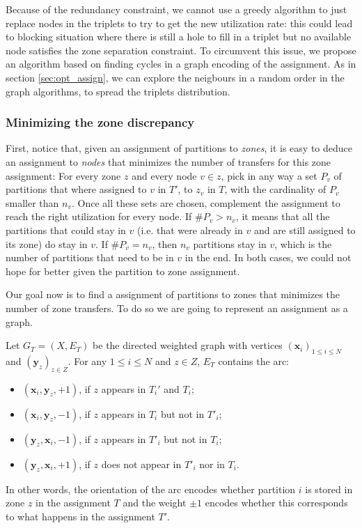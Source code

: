 \documentclass[]{article}
\begin{document}
Because of the redundancy constraint, we cannot use a greedy algorithm to just replace nodes in the triplets to try to get the new utilization rate: this could lead to blocking situation where there is still a hole to fill in a triplet but no available node satisfies the zone separation constraint. To circumvent this issue, we propose an algorithm based on finding cycles in a graph encoding of the assignment. As in section \ref{sec:opt_assign}, we can explore the neigbours in a random order in the graph algorithms, to spread the triplets distribution.


\subsubsection{Minimizing the zone discrepancy}


First, notice that, given an assignment of partitions to \emph{zones}, it is easy to deduce an assignment to \emph{nodes} that minimizes the number of transfers for this zone assignment: For every zone $z$ and every node $v\in z$, pick in any way a set $P_v$ of partitions that where assigned to $v$ in $T'$, to $z_v$ in $T$, with the cardinality of $P_v$ smaller than $n_v$. Once all these sets are chosen, complement the assignment to reach the right utilization for every node. If $\#P_v > n_v$, it means that all the partitions that could stay in $v$ (i.e. that were already in $v$ and are still assigned to its zone) do stay in $v$. If $\#P_v = n_v$, then $n_v$ partitions stay in $v$, which is the number of partitions that need to be in $v$ in the end. In both cases, we could not hope for better given the partition to zone assignment.

Our goal now is to find a assignment of partitions to zones that minimizes the number of zone transfers. To do so we are going to represent an assignment as a graph.

Let $G_T=(X,E_T)$ be the directed weighted graph with vertices $(\mathbf{x}_i)_{1\le i\le N}$ and $(\mathbf{y}_z)_{z\in Z}$. For any $1\le i\le N$ and $z\in Z$, $E_T$ contains  the arc:
\begin{itemize}
	\item $(\mathbf{x}_i, \mathbf{y}_z, +1)$, if $z$ appears in $T_i'$ and $T_i$;
	\item $(\mathbf{x}_i, \mathbf{y}_z, -1)$, if $z$ appears in $T_i$ but not in $T'_i$;
	\item $(\mathbf{y}_z, \mathbf{x}_i, -1)$, if $z$ appears in $T'_i$ but not in $T_i$;
	\item $(\mathbf{y}_z, \mathbf{x}_i, +1)$, if $z$ does not appear in $T'_i$ nor in $T_i$.
\end{itemize}
In other words, the orientation of the arc encodes whether partition $i$ is stored in zone $z$ in the assignment $T$ and the weight $\pm 1$ encodes whether this corresponds to what happens in the assignment $T'$.
\end{document}
